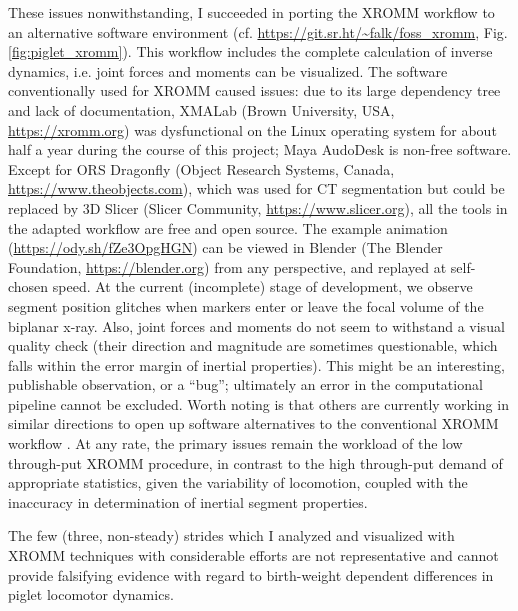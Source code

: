 These issues nonwithstanding, I succeeded in porting the XROMM workflow \citep{Brainerd2010} to an alternative software environment (cf. \url{https://git.sr.ht/\~falk/foss\_xromm}, Fig. \ref{fig:piglet_xromm}).
This workflow includes the complete calculation of inverse dynamics, i.e. joint forces and moments can be visualized.
The software conventionally used for XROMM caused issues: due to its large dependency tree and lack of documentation, XMALab (Brown University, USA, \url{https://xromm.org}) was dysfunctional on the Linux operating system for about half a year during the course of this project; Maya AudoDesk is non-free software.
Except for ORS Dragonfly (Object Research Systems, Canada, \url{https://www.theobjects.com}), which was used for CT segmentation but could be replaced by 3D Slicer (Slicer Community, \url{https://www.slicer.org}), all the tools in the adapted workflow are free and open source.
The example animation (\url{https://ody.sh/fZe3OpgHGN}) can be viewed in Blender (The Blender Foundation, \url{https://blender.org}) from any perspective, and replayed at self-chosen speed.
At the current (incomplete) stage of development, we observe segment position glitches when markers enter or leave the focal volume of the biplanar x-ray.
Also, joint forces and moments do not seem to withstand a visual quality check (their direction and magnitude are sometimes questionable, which falls within the error margin of inertial properties).
This might be an interesting, publishable observation, or a ``bug''; ultimately an error in the computational pipeline cannot be excluded.
Worth noting is that others are currently working in similar directions to open up software alternatives to the conventional XROMM workflow \citep{Falkingham2023}.
At any rate, the primary issues remain the workload of the low through-put XROMM procedure, in contrast to the high through-put demand of appropriate statistics, given the variability of locomotion, coupled with the inaccuracy in determination of inertial segment properties.

The few (three, non-steady) strides which I analyzed and visualized with XROMM techniques with considerable efforts are not representative and cannot provide falsifying evidence with regard to birth-weight dependent differences in piglet locomotor dynamics.


